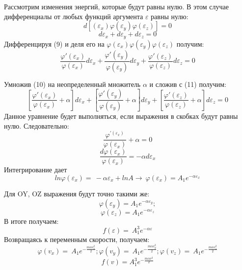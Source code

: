\documentclass[a4paper,12pt]{article}
\begin{document}
Рассмотрим изменения энергий, которые будут равны нулю. В этом случае дифференциалы от любых функций аргумента $\varepsilon$ равны нулю:
\begin{equation}
d\left[\left(\varepsilon_x\right)\varphi\left(\varepsilon_y\right)\varphi\left(\varepsilon_z\right)\right]=0\end{equation}
\begin{equation}
d\varepsilon_x+d\varepsilon_y+d\varepsilon_z=0
\end{equation}
Дифференцируя (9) и деля его на $\varphi\left(\varepsilon_x\right)\varphi\left(\varepsilon_y\right)\varphi\left(\varepsilon_z\right)$ получим:
\begin{equation}
\frac{\varphi\prime\left(\varepsilon_x\right)}{\varphi\left(\varepsilon_x\right)}d\varepsilon_x+\frac{\varphi\prime\left(\varepsilon_y\right)}{\varphi\left(\varepsilon_y\right)}d\varepsilon_y+\frac{\varphi\prime\left(\varepsilon_z\right)}{\varphi\left(\varepsilon_z\right)}d\varepsilon_z=0
\end{equation}

Умножив (10) на неопределенный множитель $\alpha$ и сложив с (11) получим:
\begin{equation}
\left[\frac{\varphi\prime\left(\varepsilon_x\right)}{\varphi\left(\varepsilon_x\right)}+\alpha\right]d\varepsilon_x+\left[\frac{\varphi\prime\left(\varepsilon_y\right)}{\varphi\left(\varepsilon_y\right)}+\alpha\right]d\varepsilon_y+\left[\frac{\varphi\prime\left(\varepsilon_z\right)}{\varphi\left(\varepsilon_z\right)}+\alpha\right]d\varepsilon_z=0
\end{equation}
Данное уравнение будет выполняться, если выражения в скобках будут равны нулю. Следовательно:
$$\frac{\varphi^{\prime\left(\varepsilon_x\right)}}{\varphi\left(\varepsilon_x\right)}+\alpha=0$$
$$\frac{d\varphi\left(\varepsilon_x\right)}{\varphi\left(\varepsilon_x\right)}=-\alpha d\varepsilon_x$$
Интегрирование дает
\begin{equation}
ln\varphi\left(\varepsilon_x\right)=\ -\alpha\varepsilon_x+lnA\rightarrow\ \varphi\left(\varepsilon_x\right)=A_1e^{-\alpha\varepsilon_x}
\end{equation}

Для OY, OZ выражения будут точно такими же:
$$\varphi\left(\varepsilon_y\right)=A_1e^{-\alpha\varepsilon_y};$$ $$\varphi\left(\varepsilon_z\right)=A_1e^{-\alpha\varepsilon_z}$$
В итоге получаем:
\begin{equation}
f\left(\varepsilon\right)=\ A_1^3e^{-\alpha\varepsilon}
\end{equation}
Возвращаясь к переменным скорости, получаем:
$$
\varphi\left(v_x\right)=\ A_1e^{-\frac{m\alpha v_x^2}{2}}; \varphi\left(v_y\right)=\ A_1e^{-\frac{m\alpha v_y^2}{2}}; \varphi\left(v_z\right)=\ A_1e^{-\frac{m\alpha v_z^2}{2}}
$$
\begin{equation}
f\left(v\right)= A_1^3e^{-\frac{m\alpha v^2}{2}}
\end{equation}
\end{document}
